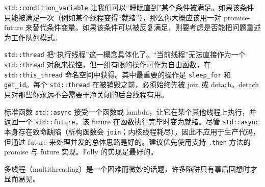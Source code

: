 \texttt{std::\allowbreak{}condition\_\allowbreak{}variable} 让我们可以“睡眠直到”某个条件被满足。如果该条件只能被满足一次（例如某个线程变得“就绪”），那么你大概应该用一对 promise-future 来替代条件变量。如果该条件可以被反复满足，则要考虑是否能把问题重述为工作队列模式。

\texttt{std::\allowbreak{}thread} 把“执行线程”这一概念具体化了。“当前线程”无法直接作为一个 \texttt{std::\allowbreak{}thread} 对象来操控，但一组有限的操作可作为自由函数，在 \texttt{std::\allowbreak{}this\_\allowbreak{}thread} 命名空间中获得。其中最重要的操作是 \texttt{sleep\_\allowbreak{}for} 和 \texttt{get\_\allowbreak{}id}。每个 \texttt{std::\allowbreak{}thread} 在被销毁之前，必须始终先被 join 或 detach。detach 只对那些你永远不会需要干净关闭的后台线程有用。

标准函数 \texttt{std::\allowbreak{}async} 接受一个函数或 lambda，让它在某个其他线程上执行，并返回一个 \texttt{std::\allowbreak{}future}，该 future 在函数执行完毕时变为就绪。尽管 \texttt{std::\allowbreak{}async} 本身存在致命缺陷（析构函数会 \texttt{join}；内核线程耗尽），因此不应用于生产代码，但通过 future 来处理并发的总体思路是好的。建议优先使用支持 \texttt{.then} 方法的 promise 与 future 实现。Folly 的实现是最好的。

多线程（multithreading）是一个困难而微妙的话题，许多陷阱只有事后回想时才显而易见。
